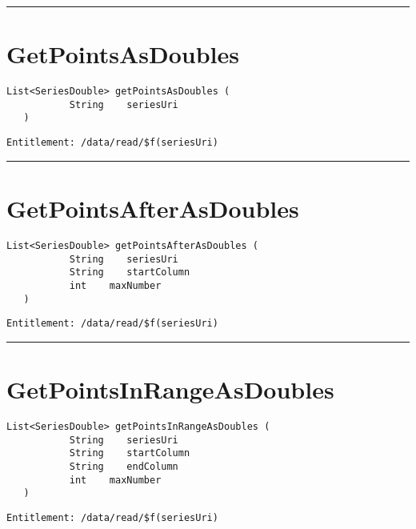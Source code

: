 \rule{12cm}{2pt}
\section{GetPointsAsDoubles}
\label{Api:GetPointsAsDoubles}
\begin{lstlisting}[style=nonumbers]
   List<SeriesDouble> getPointsAsDoubles (
           String    seriesUri
   )
\end{lstlisting}
\begin{Verbatim}[formatcom=\color{Maroon}]
  Entitlement: /data/read/$f(seriesUri)
\end{Verbatim}



\rule{12cm}{2pt}
\section{GetPointsAfterAsDoubles}
\label{Api:GetPointsAfterAsDoubles}
\begin{lstlisting}[style=nonumbers]
   List<SeriesDouble> getPointsAfterAsDoubles (
           String    seriesUri
           String    startColumn
           int    maxNumber
   )
\end{lstlisting}
\begin{Verbatim}[formatcom=\color{Maroon}]
  Entitlement: /data/read/$f(seriesUri)
\end{Verbatim}



\rule{12cm}{2pt}
\section{GetPointsInRangeAsDoubles}
\label{Api:GetPointsInRangeAsDoubles}
\begin{lstlisting}[style=nonumbers]
   List<SeriesDouble> getPointsInRangeAsDoubles (
           String    seriesUri
           String    startColumn
           String    endColumn
           int    maxNumber
   )
\end{lstlisting}
\begin{Verbatim}[formatcom=\color{Maroon}]
  Entitlement: /data/read/$f(seriesUri)
\end{Verbatim}



